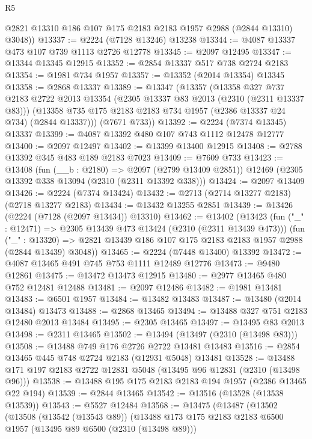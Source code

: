 \begin{lexlean}{R5}
\begin{coremodule}
      @2821 @13310 @186 @107 @175 @2183 @2183 @1957 @2988 (@2844 @13310) @3048))
@13337 := @2224 (@7128 @13246) @13238
@13344 := @4087 @13337 @473 @107 @739 @1113 @2726 @12778
@13345 := @2097 @12495
@13347 := @13344 @13345 @12915
@13352 := @2854 @13337 @517 @738 @2724 @2183
@13354 := @1981 @734 @1957
@13357 := @13352 (@2014 @13354) @13345
@13358 := @2868 @13337
@13389 := @13347
    (@13357
      (@13358
        @327
        @737
        @2183
        @2722
        @2013
        @13354
        (@2305 @13337 @83 @2013 (@2310 (@2311 @13337 @83)))
        (@13358 @735 @175 @2183 @2183 @734 @1957 (@2386 @13337 @24 @734) (@2844 @13337)))
      (@7671 @733))
@13392 := @2224 (@7374 @13345) @13337
@13399 := @4087 @13392 @480 @107 @743 @1112 @12478 @12777
@13400 := @2097 @12497
@13402 := @13399 @13400 @12915
@13408 := @2788 @13392 @345 @483 @189 @2183 @7023
@13409 := @7609 @733
@13423 := @13408
    (fun (__b : @2180) => @2097 (@2799 @13409 @2851))
    @12469
    (@2305 @13392 @338 @13094 (@2310 (@2311 @13392 @338)))
@13424 := @2097 @13409
@13426 := @2224 (@7374 @13424)
@13432 := @2713 (@2714 @13277 @2183) (@2718 @13277 @2183)
@13434 := @13432 @13255 @2851
@13439 := @13426 (@2224 (@7128 (@2097 @13434)) @13310)
@13462 := @13402
    (@13423
      (fun ("_" : @12471) => @2305 @13439 @473 @13424 (@2310 (@2311 @13439 @473)))
      (fun ("_" : @13320) =>
      @2821 @13439 @186 @107 @175 @2183 @2183 @1957 @2988 (@2844 @13439) @3048))
@13465 := @2224 (@7448 @13400) @13392
@13472 := @4087 @13465 @491 @745 @753 @1111 @12489 @12776
@13473 := @9480 @12861
@13475 := @13472 @13473 @12915
@13480 := @2977 @13465 @480 @752 @12481 @12488
@13481 := @2097 @12486
@13482 := @1981 @13481
@13483 := @6501 @1957
@13484 := @13482 @13483
@13487 := @13480 (@2014 @13484) @13473
@13488 := @2868 @13465
@13494 := @13488 @327 @751 @2183 @12480 @2013 @13484
@13495 := @2305 @13465
@13497 := @13495 @83 @2013
@13498 := @2311 @13465
@13502 := @13494 (@13497 (@2310 (@13498 @83)))
@13508 := @13488 @749 @176 @2726 @2722 @13481 @13483
@13516 := @2854 @13465 @445 @748 @2724 @2183 (@12931 @5048) @13481
@13528 := @13488 @171 @197 @2183 @2722 @12831 @5048 (@13495 @96 @12831 (@2310 (@13498 @96)))
@13538 := @13488 @195 @175 @2183 @2183 @194 @1957 (@2386 @13465 @22 @194)
@13539 := @2844 @13465
@13542 := @13516 (@13528 (@13538 @13539))
@13543 := @5527 @12484
@13568 := @13475
    (@13487
      (@13502
        (@13508
          (@13542 (@13543 @89))
          (@13488
            @173
            @175
            @2183
            @2183
            @6500
            @1957
            (@13495 @89 @6500 (@2310 (@13498 @89)))

\end{coremodule}
\end{lexlean}

